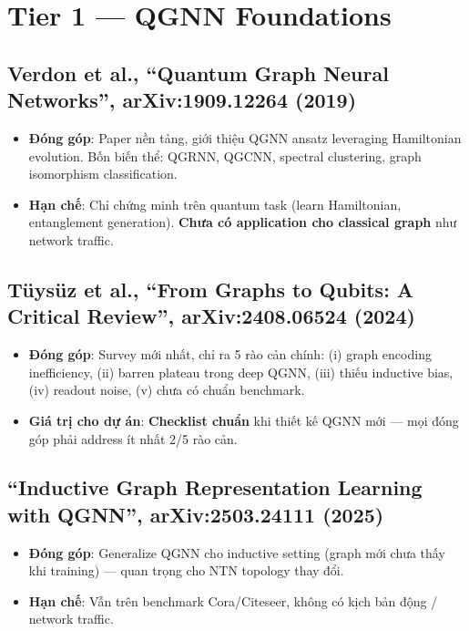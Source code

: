 \documentclass[11pt,a4paper]{article}
\begin{document}
\section{Tier 1 --- QGNN Foundations}

\subsection{Verdon et al., ``Quantum Graph Neural Networks'', arXiv:1909.12264 (2019)}
\begin{itemize}
  \item \textbf{Đóng góp}: Paper nền tảng, giới thiệu QGNN ansatz leveraging Hamiltonian evolution. Bốn biến thể: QGRNN, QGCNN, spectral clustering, graph isomorphism classification.
  \item \textbf{Hạn chế}: Chỉ chứng minh trên quantum task (learn Hamiltonian, entanglement generation). \textbf{Chưa có application cho classical graph} như network traffic.
\end{itemize}

\subsection{Tüysüz et al., ``From Graphs to Qubits: A Critical Review'', arXiv:2408.06524 (2024)}
\begin{itemize}
  \item \textbf{Đóng góp}: Survey mới nhất, chỉ ra 5 rào cản chính: (i) graph encoding inefficiency, (ii) barren plateau trong deep QGNN, (iii) thiếu inductive bias, (iv) readout noise, (v) chưa có chuẩn benchmark.
  \item \textbf{Giá trị cho dự án}: \textbf{Checklist chuẩn} khi thiết kế QGNN mới --- mọi đóng góp phải address ít nhất 2/5 rào cản.
\end{itemize}

\subsection{``Inductive Graph Representation Learning with QGNN'', arXiv:2503.24111 (2025)}
\begin{itemize}
  \item \textbf{Đóng góp}: Generalize QGNN cho inductive setting (graph mới chưa thấy khi training) --- quan trọng cho NTN topology thay đổi.
  \item \textbf{Hạn chế}: Vẫn trên benchmark Cora/Citeseer, không có kịch bản động / network traffic.
\end{itemize}
\end{document}
